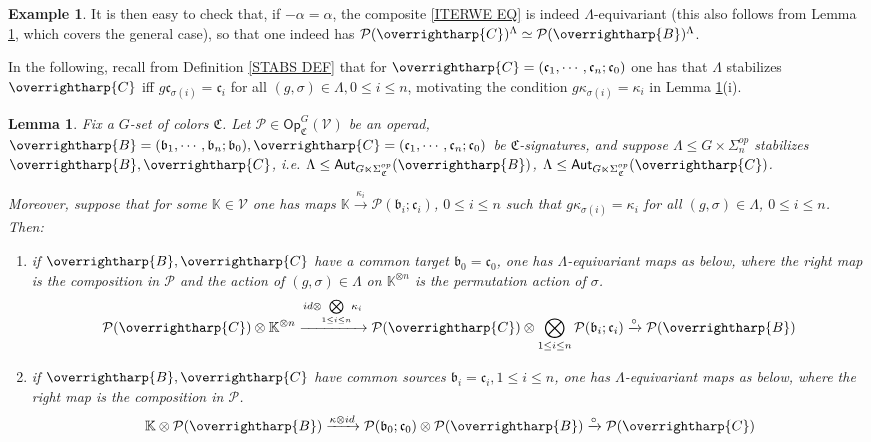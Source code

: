 \documentclass[a4paper,10pt
,draft
]{article}%
\numberwithin{equation}{section}
\numberwithin{figure}{section}
\newtheorem{lemma}[equation]{Lemma}%
\theoremstyle{definition} %
\newtheorem{example}[equation]{Example}%
\newcommand{\vect}[1]{\text{\overrightharp{\ensuremath{#1}}}}
\newcommand{\V}{\ensuremath{\mathcal V}}
\renewcommand{\P}{\ensuremath{\mathcal P}}
\newcommand{\1}{\ensuremath{\mathbbm 1}}%
\begin{document}
\begin{example}
It is then easy to check that, if $-\alpha = \alpha$,
the composite \eqref{ITERWE EQ}
is indeed $\Lambda$-equivariant
(this also follows from Lemma \ref{LAMBEQMAPS LEM},
which covers the general case), so that one indeed has
$\P(\vect{C})^{\Lambda} \simeq \P(\vect{B})^{\Lambda}$.
\end{example}


In the following, 
recall from Definition \ref{STABS DEF} that
for 
$\vect{C} = (\mathfrak{c}_1,\cdots,\mathfrak{c}_n;\mathfrak{c}_0)$
one has that $\Lambda$ stabilizes $\vect{C}$
iff 
$g \mathfrak{c}_{\sigma(i)} = \mathfrak{c}_i$
for all $(g,\sigma) \in \Lambda, 0\leq i \leq n$,
motivating the condition $g \kappa_{\sigma(i)} = \kappa_i$
in Lemma \ref{LAMBEQMAPS LEM}(i).



\begin{lemma}\label{LAMBEQMAPS LEM}
Fix a $G$-set of colors $\mathfrak{C}$.
Let $\P \in \mathsf{Op}^G_{\mathfrak{C}}(\V)$ be an operad,
$\vect{B}=(\mathfrak{b}_1,\cdots,\mathfrak{b}_n;\mathfrak{b}_0),\vect{C}=(\mathfrak{c}_1,\cdots,\mathfrak{c}_n;\mathfrak{c}_0)$ be $\mathfrak{C}$-signatures,
and suppose 
$\Lambda \leq G \times \Sigma_n^{op}$
stabilizes $\vect{B},\vect{C}$, i.e. 
$\Lambda \leq \mathsf{Aut}_{G\ltimes \Sigma_{\mathfrak{C}}^{op}}(\vect{B})$, 
$\Lambda \leq \mathsf{Aut}_{G\ltimes \Sigma_{\mathfrak{C}}^{op}}(\vect{C})$.

Moreover, suppose that for some $\mathbb{K} \in \V$
one has maps 
$\mathbb{K} \xrightarrow{\kappa_i} \P(\mathfrak{b}_i;\mathfrak{c}_i)$,  $0\leq i \leq n$
such that $g\kappa_{\sigma(i)} = \kappa_i$ for all $(g,\sigma) \in \Lambda$, $0\leq i \leq n$. Then:
\begin{enumerate}[label=(\roman*)]
\item if $\vect{B},\vect{C}$ have a common target $\mathfrak{b}_0=\mathfrak{c}_0$,
one has
$\Lambda$-equivariant maps as below, where the right map is the composition in $\P$
and the action of $(g,\sigma) \in \Lambda$ on $\mathbb{K}^{\otimes n}$
is the permutation action of $\sigma$.
\begin{equation}\label{LAMBEQMAPS EQ}
	\P(\vect{C}) \otimes %
	\mathbb{K}^{\otimes n}
\xrightarrow{id \otimes \underset{1\leq i \leq n}{\bigotimes} \kappa_i}
	\P(\vect{C}) \otimes \bigotimes_{1\leq i \leq n} \P(\mathfrak{b}_i;\mathfrak{c}_i)
	\xrightarrow{\circ}
	\P(\vect{B})
\end{equation}
\item
if $\vect{B},\vect{C}$ have common sources $\mathfrak{b}_i=\mathfrak{c}_i,1\leq i \leq n$,
one has
$\Lambda$-equivariant maps as below, where the right map is the composition in $\P$.
\[
	\mathbb{K} \otimes \P(\vect{B}) 
\xrightarrow{\kappa \otimes id}
	\P(\mathfrak{b}_0;\mathfrak{c}_0) \otimes \P(\vect{B}) 
	\xrightarrow{\circ}
	\P(\vect{C})
\]
\end{enumerate}
\end{lemma}
\end{document}
